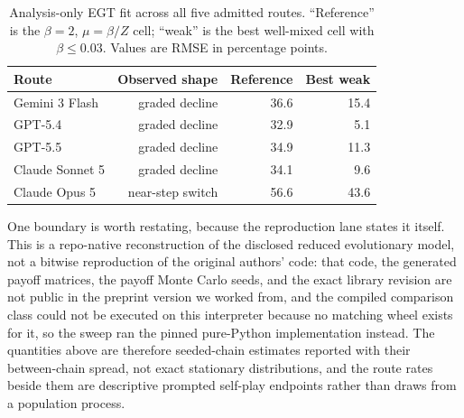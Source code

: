 \documentclass{article}
\begin{document}
\begin{table}[t]
    \caption{Analysis-only EGT fit across all five admitted routes. ``Reference''
    is the $\beta=2$, $\mu=\beta/Z$ cell; ``weak'' is the best well-mixed cell
    with $\beta\leq 0.03$. Values are RMSE in percentage points.}
    \label{tab:egt-five-route-fit}
    \centering
    \scriptsize
    \begin{tabular}{@{}lrrr@{}}
        \toprule
        Route & Observed shape & Reference & Best weak \\
        \midrule
        Gemini 3 Flash  & graded decline & 36.6 & 15.4 \\
        GPT-5.4         & graded decline & 32.9 &  5.1 \\
        GPT-5.5         & graded decline & 34.9 & 11.3 \\
        Claude Sonnet 5 & graded decline & 34.1 &  9.6 \\
        Claude Opus 5   & near-step switch & 56.6 & 43.6 \\
        \bottomrule
    \end{tabular}
\end{table}

One boundary is worth restating, because the reproduction lane states it
itself. This is a repo-native reconstruction of the disclosed reduced
evolutionary model, not a bitwise reproduction of the original authors' code:
that code, the generated payoff matrices, the payoff Monte Carlo seeds, and
the exact library revision are not public in the preprint version we worked
from, and the compiled comparison class could not be executed on this
interpreter because no matching wheel exists for it, so the sweep ran the
pinned pure-Python implementation instead. The quantities above are therefore
seeded-chain estimates reported with their between-chain spread, not exact
stationary distributions, and the route rates beside them are descriptive
prompted self-play endpoints rather than draws from a population process.
\end{document}
